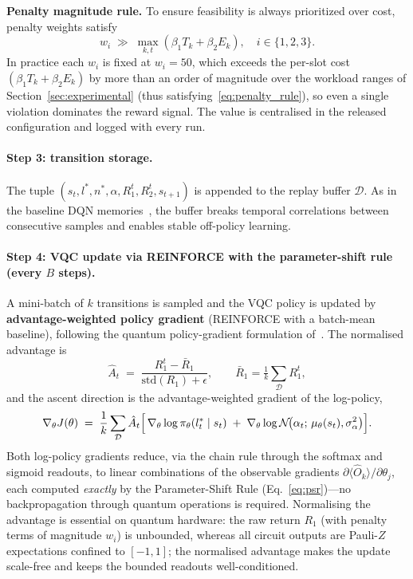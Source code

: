 \documentclass[11pt,a4paper]{article}
\theoremstyle{definition}
\begin{document}
\noindent\textbf{Penalty magnitude rule.} To ensure feasibility is always prioritized over cost, penalty weights satisfy
\begin{equation}
  w_i \;\gg\; \max_{k,t}\!\left(\beta_1 T_k + \beta_2 E_k\right),
  \quad i \in \{1,2,3\}.
  \label{eq:penalty_rule}
\end{equation}
In practice each $w_i$ is fixed at $w_i=50$, which exceeds the per-slot cost $(\beta_1 T_k+\beta_2 E_k)$ by more than an order of magnitude over the workload ranges of Section~\ref{sec:experimental} (thus satisfying~\eqref{eq:penalty_rule}), so even a single violation dominates the reward signal. The value is centralised in the released configuration and logged with every run.

\paragraph{Step 3: transition storage.}
The tuple $(s_t, l^*, n^*, \alpha, R_1^t, R_2^t, s_{t+1})$ is appended to the replay buffer $\mathcal{D}$. As in the baseline DQN memories~\cite{hrl_ntn}, the buffer breaks temporal correlations between consecutive samples and enables stable off-policy learning.

\paragraph{Step 4: VQC update via REINFORCE with the parameter-shift rule (every $B$ steps).}
A mini-batch of $k$ transitions is sampled and the VQC policy is updated by \textbf{advantage-weighted policy gradient} (REINFORCE with a batch-mean baseline), following the quantum policy-gradient formulation of~\cite{jerbi2021policies,sequeira2023policygradient}. The normalised advantage is
\begin{equation}
  \hat A_t \;=\; \frac{R_1^t - \bar R_1}{\mathrm{std}(R_1) + \epsilon},
  \qquad \bar R_1 = \tfrac1k\textstyle\sum_{\mathcal D} R_1^t,
  \label{eq:advantage}
\end{equation}
and the ascent direction is the advantage-weighted gradient of the log-policy,
\begin{equation}
  \nabla_\theta J(\theta)
  \;=\; \frac1k \sum_{\mathcal D} \hat A_t
  \Bigl[\, \nabla_\theta \log \pi_\theta(l^*_t \mid s_t)
        \;+\; \nabla_\theta \log \mathcal N\!\bigl(\alpha_t;\, \mu_\theta(s_t), \sigma_\alpha^2\bigr) \Bigr].
  \label{eq:vqc_pg}
\end{equation}
Both log-policy gradients reduce, via the chain rule through the softmax and sigmoid readouts, to linear combinations of the observable gradients $\partial\langle\hat O_k\rangle/\partial\theta_j$, each computed \emph{exactly} by the Parameter-Shift Rule (Eq.~\eqref{eq:psr})---no backpropagation through quantum operations is required. Normalising the advantage is essential on quantum hardware: the raw return $R_1$ (with penalty terms of magnitude $w_i$) is unbounded, whereas all circuit outputs are Pauli-$Z$ expectations confined to $[-1,1]$; the normalised advantage makes the update scale-free and keeps the bounded readouts well-conditioned.
\end{document}
